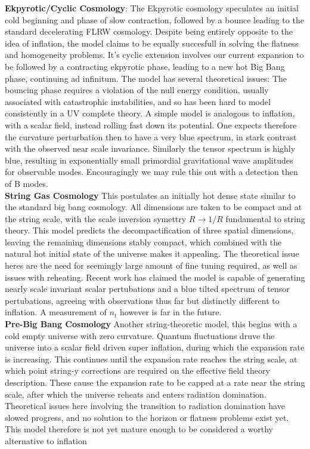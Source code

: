 \documentclass[a4paper,10pt]{article}
\begin{document}
\textbf{Ekpyrotic/Cyclic Cosmology}: The Ekpyrotic cosmology speculates an initial cold beginning and phase of slow contraction, followed by a bounce leading to the standard decelerating FLRW cosmology. Despite being entirely opposite to the idea of inflation, the model claims to be equally succesfull in solving the flatness and homogeneity problems. It's cyclic extension involves our current expansion to be followed by a contracting ekpyrotic phase, leading to a new hot Big Bang phase, continuing ad infinitum. The model has several theoretical issues: The bouncing phase requires a violation of the null energy condition, usually associated with catastrophic instabilities, and so has been hard to model consistently in a UV complete theory. A simple model is analogous to inflation, with a scalar field, instead rolling fast down its potential. One expects therefore the curvature perturbation then to have a very blue spectrum, in stark contrast with the observed near scale invariance. Similarly the tensor spectrum is highly blue, resulting in exponentially small primordial gravitational wave amplitudes for observable modes. Encouragingly we may rule this out with a detection then of B modes.\\


\textbf{String Gas Cosmology} This postulates an initially hot dense state similar to the standard big bang cosmology. All dimensions are taken to be compact and at the string scale, with the scale inversion symettry $R\rightarrow 1/R$ fundamental to string theory. This model predicts the decompactification of three spatial dimensions, leaving the remaining dimensions stably compact, which combined with the natural hot initial state of the universe makes it appealing. The theoretical issue heres are the need for seemingly large amount of fine tuning required, as well as issues with reheating. Recent work has claimed the model is capable of generating nearly scale invariant scalar pertubations and a blue tilted spectrum of tensor pertubations, agreeing with observations thus far but distinctly different to inflation. A measurement of $n_t$ however is far in the future.\\

\textbf{Pre-Big Bang Cosmology} Another string-theoretic model, this begins with a cold empty universe with zero curvature. Quantum fluctuations druve the universe into a scalar field driven super inflation, during which the expansion rate is increasing. This continues until the expansion rate reaches the string scale, at which point string-y corrections are required on the effective field theory description. These cause the expansion rate to be capped at a rate near the string scale, after which the universe reheats and enters radiation domination. Theoretical issues here involving the transition to radiation domination have slowed progress, and no solution to the horizon or flatness problems exist yet. This model therefore is not yet mature enough to be considered a worthy alternative to inflation
\end{document}
